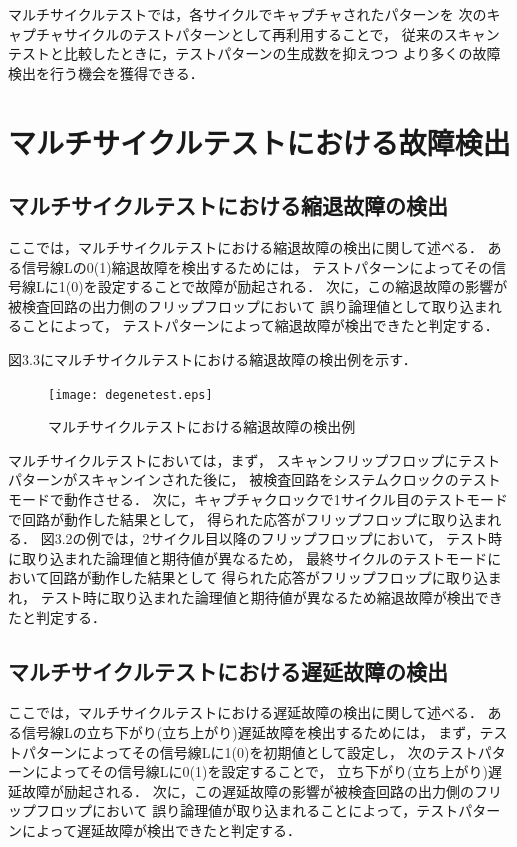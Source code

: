 マルチサイクルテストでは，各サイクルでキャプチャされたパターンを
次のキャプチャサイクルのテストパターンとして再利用することで，
従来のスキャンテストと比較したときに，テストパターンの生成数を抑えつつ
より多くの故障検出を行う機会を獲得できる．

\section{マルチサイクルテストにおける故障検出}

\subsection{マルチサイクルテストにおける縮退故障の検出}
ここでは，マルチサイクルテストにおける縮退故障の検出に関して述べる．
ある信号線Lの0(1)縮退故障を検出するためには，
テストパターンによってその信号線Lに1(0)を設定することで故障が励起される．
次に，この縮退故障の影響が被検査回路の出力側のフリップフロップにおいて
誤り論理値として取り込まれることによって，
テストパターンによって縮退故障が検出できたと判定する．

図3.3にマルチサイクルテストにおける縮退故障の検出例を示す．

\begin{figure}[h]
	\begin{center}
		\texttt{[image: degenetest.eps]}
		\caption{マルチサイクルテストにおける縮退故障の検出例}
	\end{center}
\end{figure}

マルチサイクルテストにおいては，まず，
スキャンフリップフロップにテストパターンがスキャンインされた後に，
被検査回路をシステムクロックのテストモードで動作させる．
次に，キャプチャクロックで1サイクル目のテストモードで回路が動作した結果として，
得られた応答がフリップフロップに取り込まれる．
図3.2の例では，2サイクル目以降のフリップフロップにおいて，
テスト時に取り込まれた論理値と期待値が異なるため，
最終サイクルのテストモードにおいて回路が動作した結果として
得られた応答がフリップフロップに取り込まれ，
テスト時に取り込まれた論理値と期待値が異なるため縮退故障が検出できたと判定する．

\subsection{マルチサイクルテストにおける遅延故障の検出}
ここでは，マルチサイクルテストにおける遅延故障の検出に関して述べる．
ある信号線Lの立ち下がり(立ち上がり)遅延故障を検出するためには，
まず，テストパターンによってその信号線Lに1(0)を初期値として設定し，
次のテストパターンによってその信号線Lに0(1)を設定することで，
立ち下がり(立ち上がり)遅延故障が励起される．
次に，この遅延故障の影響が被検査回路の出力側のフリップフロップにおいて
誤り論理値が取り込まれることによって，テストパターンによって遅延故障が検出できたと判定する．

